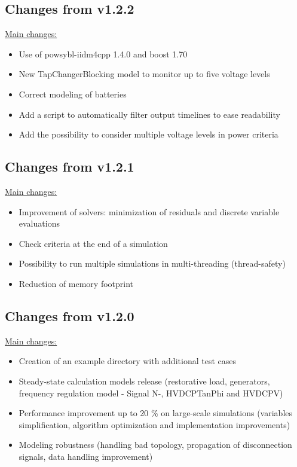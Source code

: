 \documentclass[a4paper, 12pt]{report}
\begin{document}
\subsection{Changes from v1.2.2}

\underline{Main changes:}
\begin{itemize}
\item Use of powsybl-iidm4cpp 1.4.0 and boost 1.70
\item New TapChangerBlocking model to monitor up to five voltage levels
\item Correct modeling of batteries
\item Add a script to automatically filter output timelines to ease readability
\item Add the possibility to consider multiple voltage levels in power criteria
\end{itemize}

\subsection{Changes from v1.2.1}

\underline{Main changes:}
\begin{itemize}
\item Improvement of solvers: minimization of residuals and discrete variable evaluations
\item Check criteria at the end of a simulation
\item Possibility to run multiple simulations in multi-threading (thread-safety)
\item Reduction of memory footprint
\end{itemize}

\subsection{Changes from v1.2.0}

\underline{Main changes:}
\begin{itemize}
\item Creation of an example directory with additional test cases
\item Steady-state calculation models release (restorative load, generators, frequency regulation model - Signal N-, HVDCPTanPhi and HVDCPV)
\item Performance improvement up to 20 \% on large-scale simulations (variables simplification, algorithm optimization and implementation improvements)
\item Modeling robustness (handling bad topology, propagation of disconnection signals, data handling improvement)
\end{itemize}
\end{document}
